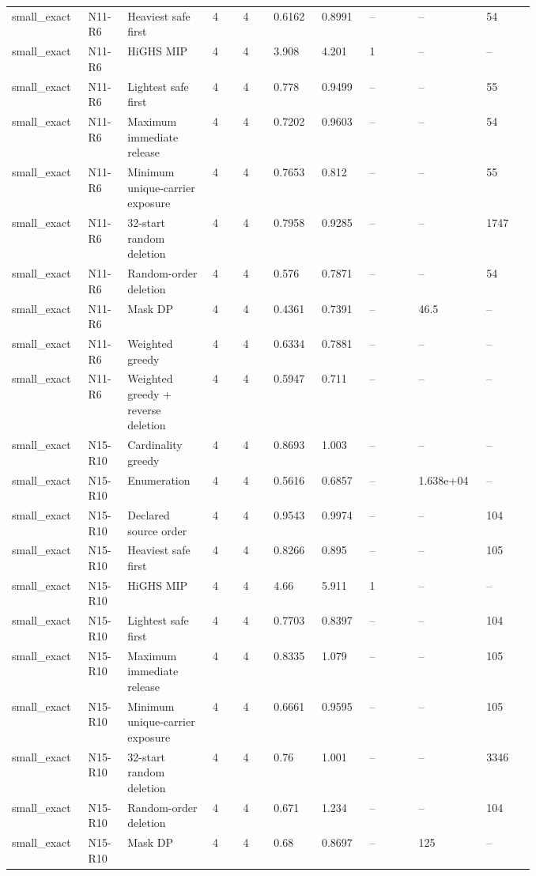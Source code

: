 {\begin{longtable}{p{0.07\linewidth}p{0.06\linewidth}p{0.13\linewidth}p{0.055\linewidth}p{0.055\linewidth}p{0.075\linewidth}p{0.075\linewidth}p{0.085\linewidth}p{0.085\linewidth}p{0.085\linewidth}}
small\_exact & N11-R6 & Heaviest safe first & 4 & 4 & 0.6162 & 0.8991 & -- & -- & 54 \\
small\_exact & N11-R6 & HiGHS MIP & 4 & 4 & 3.908 & 4.201 & 1 & -- & -- \\
small\_exact & N11-R6 & Lightest safe first & 4 & 4 & 0.778 & 0.9499 & -- & -- & 55 \\
small\_exact & N11-R6 & Maximum immediate release & 4 & 4 & 0.7202 & 0.9603 & -- & -- & 54 \\
small\_exact & N11-R6 & Minimum unique-carrier exposure & 4 & 4 & 0.7653 & 0.812 & -- & -- & 55 \\
small\_exact & N11-R6 & 32-start random deletion & 4 & 4 & 0.7958 & 0.9285 & -- & -- & 1747 \\
small\_exact & N11-R6 & Random-order deletion & 4 & 4 & 0.576 & 0.7871 & -- & -- & 54 \\
small\_exact & N11-R6 & Mask DP & 4 & 4 & 0.4361 & 0.7391 & -- & 46.5 & -- \\
small\_exact & N11-R6 & Weighted greedy & 4 & 4 & 0.6334 & 0.7881 & -- & -- & -- \\
small\_exact & N11-R6 & Weighted greedy + reverse deletion & 4 & 4 & 0.5947 & 0.711 & -- & -- & -- \\
small\_exact & N15-R10 & Cardinality greedy & 4 & 4 & 0.8693 & 1.003 & -- & -- & -- \\
small\_exact & N15-R10 & Enumeration & 4 & 4 & 0.5616 & 0.6857 & -- & 1.638e+04 & -- \\
small\_exact & N15-R10 & Declared source order & 4 & 4 & 0.9543 & 0.9974 & -- & -- & 104 \\
small\_exact & N15-R10 & Heaviest safe first & 4 & 4 & 0.8266 & 0.895 & -- & -- & 105 \\
small\_exact & N15-R10 & HiGHS MIP & 4 & 4 & 4.66 & 5.911 & 1 & -- & -- \\
small\_exact & N15-R10 & Lightest safe first & 4 & 4 & 0.7703 & 0.8397 & -- & -- & 104 \\
small\_exact & N15-R10 & Maximum immediate release & 4 & 4 & 0.8335 & 1.079 & -- & -- & 105 \\
small\_exact & N15-R10 & Minimum unique-carrier exposure & 4 & 4 & 0.6661 & 0.9595 & -- & -- & 105 \\
small\_exact & N15-R10 & 32-start random deletion & 4 & 4 & 0.76 & 1.001 & -- & -- & 3346 \\
small\_exact & N15-R10 & Random-order deletion & 4 & 4 & 0.671 & 1.234 & -- & -- & 104 \\
small\_exact & N15-R10 & Mask DP & 4 & 4 & 0.68 & 0.8697 & -- & 125 & -- \\

\end{longtable}}
